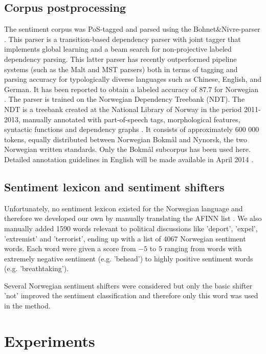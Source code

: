 \documentclass[11pt]{article}
\begin{document}
\subsection{Corpus postprocessing}
The sentiment corpus was PoS-tagged and parsed using the
Bohnet\&Nivre-parser \cite{Boh:Niv:12}. This parser is a
transition-based dependency parser with joint tagger that implements
global learning and a beam search for non-projective labeled
dependency parsing.  This latter parser has recently outperformed
pipeline systems (such as the Malt and MST parsers) both in terms of
tagging and parsing accuracy for typologically diverse languages such
as Chinese, English, and German. It has been reported to obtain a
labeled accuracy of 87.7 for Norwegian \cite{Sol14}.  The parser is
trained on the Norwegian Dependency Treebank (NDT). The NDT is a
treebank created at the National Library of Norway in the period
2011-2013, manually annotated with part-of-speech tags, morphological
features, syntactic functions and dependency graphs \cite{Sol14,Sol13}. It consists of approximately 600 000 tokens, equally
distributed between Norwegian Bokm{\aa}l and Nynorsk, the two Norwegian
written standards. Only the Bokm{\aa}l subcorpus has been used here. Detailed annotation guidelines in English
will be made available in April 2014 \cite{Kinn2013}.

\subsection{Sentiment lexicon and sentiment shifters}

Unfortunately, no sentiment lexicon existed for the Norwegian language and therefore we developed our own by manually translating the AFINN list \cite{Nielsen11}. We also manually added 1590 words relevant to political discussions  like 'deport', 'expel', 'extremist' and 'terrorist', ending up with a list of 4067 Norwegian sentiment words. Each word were given a score from $-5$ to $5$ ranging from words with extremely negative sentiment (e.g. 'behead') to highly positive sentiment words (e.g. 'breathtaking').

Several Norwegian sentiment shifters were considered but only the basic shifter 'not' improved the sentiment classification and therefore only this word was used in the method.

\section{Experiments}
\label{sec:exp}
\end{document}
